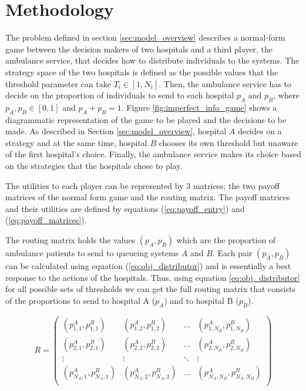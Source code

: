 \section{Methodology}\label{sec:methodology}

The problem defined in section \ref{sec:model_overview} describes a normal-form
game between the decision makers of two hospitals and a third player, the 
ambulance service, that 
decides how to distribute individuals to the systems.
The strategy space of the two hospitals is defined as the possible values
that the threshold parameter can take \(T_i \in [1, N_i]\).
Then, the ambulance service has to decide on the proportion of individuals to 
send to 
each hospital \(p_A \text{ and } p_B\), where \(p_A, p_B \in [0, 1] \)
and \(p_A + p_B = 1\).
Figure \ref{fig:imperfect_info_game} 
shows a diagrammatic representation of the game to be played and the decisions 
to be made.
As described in Section \ref{sec:model_overview}, hospital \(A\) decides
on a strategy and at the same time, hospital \(B\) chooses its own 
threshold but unaware of the first hospital's choice.
Finally, the ambulance service makes its choice based on the strategies that the 
hospitals chose to play. 

The utilities to each player can be represented by 3 matrices; the two payoff 
matrices of the normal form game and the routing matrix.
The payoff matrices and their utilities are defined by equations 
(\ref{eq:payoff_entry}) and (\ref{eq:payoff_matrices}).

The routing matrix holds the values \((p_A, p_B)\) which are the proportion 
of ambulance patients to send to queueing systems \(A\) and \(B\).
Each pair \((p_A, p_B)\) can be calculated using equation 
(\ref{eq:obj_distributor}) and is essentially
a best response to the actions of the hospitals.
Thus, using equation \ref{eq:obj_distributor} for all possible sets of 
thresholds we can get the full routing matrix that consists of the proportions
to send to hospital A (\(p_A\)) and to hospital B (\(p_B\)).

\begin{equation}\label{eq:routing_matrix}
    R = 
    \begin{pmatrix}
        (p_{1,1}^A, p_{1,1}^B) & (p_{1,2}^A, p_{1,2}^B) & \dots & 
        (p_{1,N_B}^A, p_{1,N_B}^B) \\
        (p_{2,1}^A, p_{2,1}^B) & (p_{2,2}^A, p_{2,2}^B) & \dots & 
        (p_{2,N_B}^A, p_{2,N_B}^B) \\
        \vdots & \vdots & \ddots & \vdots \\
        (p_{N_A,1}^A, p_{N_A,1}^B) & (p_{N_A,2}^A, p_{N_A,2}^B) & \dots & 
        (p_{N_A,N_B}^A, p_{N_A,N_B}^B) \\
    \end{pmatrix}
\end{equation}

